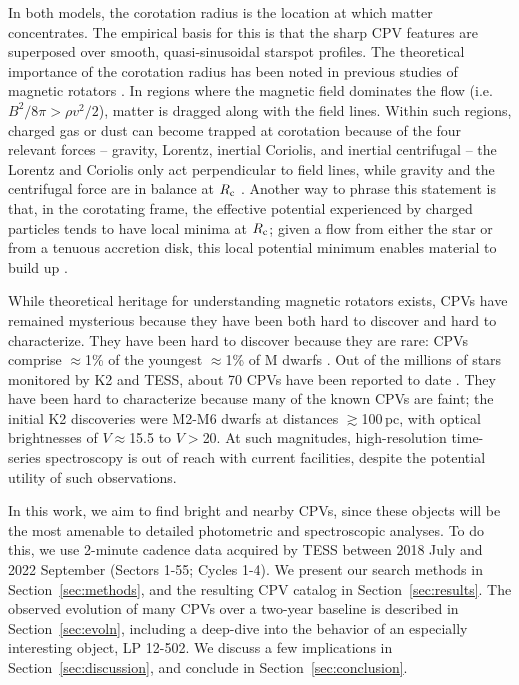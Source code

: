 \documentclass[11pt,twocolumn,tighten,linenumbers]{aastex63}
\begin{document}
In both models, the corotation radius is the location at which matter
concentrates.  The empirical basis for this is that the sharp CPV
features are superposed over smooth, quasi-sinusoidal starspot
profiles.  The theoretical importance of the corotation radius has
been noted in previous studies of magnetic rotators
\citep[e.g.][]{1973ApJ...184..271L,1985Ap&SS.116..285N,1991ApJ...370L..39K,2005ApJ...634.1214L}.
In regions where the magnetic field dominates the flow (i.e.~$B^2/8\pi
> \rho v^2 /2$), matter is dragged along with the field lines.  Within
such regions, charged gas or dust can become trapped at corotation
because of the four relevant forces -- gravity, Lorentz, inertial
Coriolis, and inertial centrifugal -- the Lorentz and Coriolis only
act perpendicular to field lines, while gravity and the centrifugal
force are in balance at $R_{\rm c}$ \citep[e.g.][their
Section~2]{2005MNRAS.357..251T}.  Another way to phrase this statement
is that, in the corotating frame, the effective potential experienced
by charged particles tends to have local minima at $R_{\rm c}$; given
a flow from either the star or from a tenuous accretion disk, this
local potential minimum enables material to build up
\citep{2005MNRAS.357..251T}.

While theoretical heritage for understanding magnetic rotators exists,
CPVs have remained mysterious because they have been both hard to
discover and hard to characterize.   They have been hard to discover
because they are rare: CPVs comprise $\approx$1\% of the youngest
$\approx$1\% of M dwarfs \citep{2018AJ....155..196R}.  Out of the
millions of stars monitored by K2 and TESS, about 70 CPVs have been
reported to date
\citep{2016AJ....152..114R,2017AJ....153..152S,2018AJ....155...63S,2019ApJ...876..127Z,2020AJ....160...86B,2021AJ....161...60S,2022AJ....163..144G,2023ApJ...945..114P}.
They have been hard to characterize because many of the known CPVs are
faint; the initial K2 discoveries
\citep{2016AJ....152..114R,2017AJ....153..152S} were M2-M6 dwarfs at
distances $\gtrsim$100\,pc, with optical brightnesses of
$V$$\approx$15.5 to $V$$>$20.  At such magnitudes, high-resolution
time-series spectroscopy is out of reach with current facilities,
despite the potential utility of such observations.

In this work, we aim to find bright and nearby CPVs, since these
objects will be the most amenable to detailed photometric and
spectroscopic analyses.  To do this, we use 2-minute cadence data
acquired by TESS between 2018 July and 2022 September (Sectors 1-55;
Cycles 1-4).  We present our search methods in
Section~\ref{sec:methods}, and the resulting CPV catalog in
Section~\ref{sec:results}.  The observed evolution of many CPVs over a
two-year baseline is described in Section~\ref{sec:evoln}, including a
deep-dive into the behavior of an especially interesting object, LP
12-502.  We discuss a few implications in
Section~\ref{sec:discussion}, and conclude in
Section~\ref{sec:conclusion}.
\end{document}
